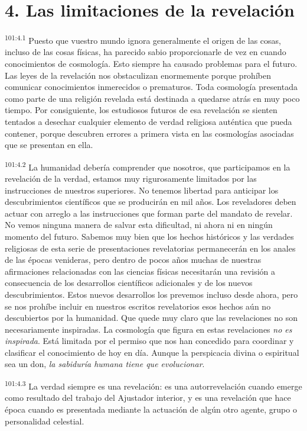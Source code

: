 \section*{4. Las limitaciones de la revelación}
\par
\textsuperscript{101:4.1} Puesto que vuestro mundo ignora generalmente el origen de las cosas, incluso de las cosas físicas, ha parecido sabio proporcionarle de vez en cuando conocimientos de cosmología. Esto siempre ha causado problemas para el futuro. Las leyes de la revelación nos obstaculizan enormemente porque prohíben comunicar conocimientos inmerecidos o prematuros. Toda cosmología presentada como parte de una religión revelada está destinada a quedarse atrás en muy poco tiempo. Por consiguiente, los estudiosos futuros de esa revelación se sienten tentados a desechar cualquier elemento de verdad religiosa auténtica que pueda contener, porque descubren errores a primera vista en las cosmologías asociadas que se presentan en ella.

\par
\textsuperscript{101:4.2} La humanidad debería comprender que nosotros, que participamos en la revelación de la verdad, estamos muy rigurosamente limitados por las instrucciones de nuestros superiores. No tenemos libertad para anticipar los descubrimientos científicos que se producirán en mil años. Los reveladores deben actuar con arreglo a las instrucciones que forman parte del mandato de revelar. No vemos ninguna manera de salvar esta dificultad, ni ahora ni en ningún momento del futuro. Sabemos muy bien que los hechos históricos y las verdades religiosas de esta serie de presentaciones revelatorias permanecerán en los anales de las épocas venideras, pero dentro de pocos años muchas de nuestras afirmaciones relacionadas con las ciencias físicas necesitarán una revisión a consecuencia de los desarrollos científicos adicionales y de los nuevos descubrimientos. Estos nuevos desarrollos los prevemos incluso desde ahora, pero se nos prohíbe incluir en nuestros escritos revelatorios esos hechos aún no descubiertos por la humanidad. Que quede muy claro que las revelaciones no son necesariamente inspiradas. La cosmología que figura en estas revelaciones \textit{no es inspirada}. Está limitada por el permiso que nos han concedido para coordinar y clasificar el conocimiento de hoy en día. Aunque la perspicacia divina o espiritual sea un don, \textit{la sabiduría humana tiene que evolucionar}.

\par
\textsuperscript{101:4.3} La verdad siempre es una revelación: es una autorrevelación cuando emerge como resultado del trabajo del Ajustador interior, y es una revelación que hace época cuando es presentada mediante la actuación de algún otro agente, grupo o personalidad celestial.

